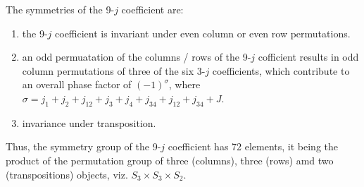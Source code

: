 The symmetries of the 9-$j$ coefficient are:
\begin{enumerate}
\item the 9-$j$ coefficient is invariant under even column or even row permutations.
\item an odd permuatation of the columns / rows of the 9-$j$ cofficient results in odd column permutations of three of the six 3-$j$ coefficients, which contribute to an overall phase factor of $(-1)^\sigma $, where $\sigma = j_1+j_2+j_{12}+j_3+j_4+j_{34}+j_{12}+j_{34}+J$.
\item invariance under transposition.
\end{enumerate}

Thus, the symmetry group of the 9-$j$ coefficient has 72 elements, it being the product of the permutation group of three (columns), three (rows) amd two (transpositions) objects, viz.
$S_3 \times  S_3 \times S_2$.

